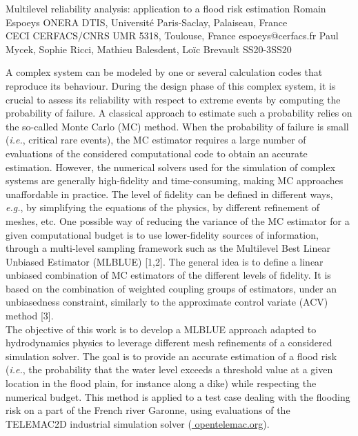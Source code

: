 \begin{talk}
  {Multilevel reliability analysis: application to a flood risk estimation}%
  {Romain Espoeys}%
  {ONERA DTIS, Université Paris-Saclay, Palaiseau, France \\
  CECI CERFACS/CNRS UMR 5318, Toulouse, France}
  {espoeys@cerfacs.fr}%
  {Paul Mycek, Sophie Ricci, Mathieu Balesdent, Loïc Brevault}%
{}{}{SS20-3}{SS20}


A complex system can be modeled by one or several calculation codes that reproduce its behaviour. During the design phase of this complex system, it is crucial to assess its reliability with respect to extreme events by computing the probability of failure. A classical approach to estimate such a probability relies on the so-called Monte Carlo (MC) method. When the probability of failure is small (\textit{i.e.}, critical rare events), the MC estimator requires a large number of evaluations of the considered computational code to obtain an accurate estimation. However, the numerical solvers used for the simulation of complex systems are generally high-fidelity and time-consuming, making MC approaches unaffordable in practice. The level of fidelity can be defined in different ways, \textit{e.g.}, by simplifying the equations of the physics, by different refinement of meshes, etc. One possible way of reducing the variance of the MC estimator for a given computational budget is to use lower-fidelity sources of information, through a multi-level sampling framework such as the Multilevel Best Linear Unbiased Estimator (MLBLUE) [1,2]. The general idea is to define a linear unbiased combination of MC estimators of the different levels of fidelity. It is based on the combination of weighted coupling groups of estimators, under an unbiasedness constraint, similarly to the approximate control variate (ACV) method [3]. \\
The objective of this work is to develop a MLBLUE approach adapted to hydrodynamics physics to leverage different mesh refinements of a considered simulation solver. The goal is to provide an accurate estimation of a flood risk (\textit{i.e.}, the probability that the water level exceeds a threshold value at a given location in the flood plain, for instance along a dike) while respecting the numerical budget. This method is applied to a test case dealing with the flooding risk on a part of the French river Garonne, using evaluations of the TELEMAC2D industrial simulation solver (\url{ opentelemac.org}).



\end{talk}
